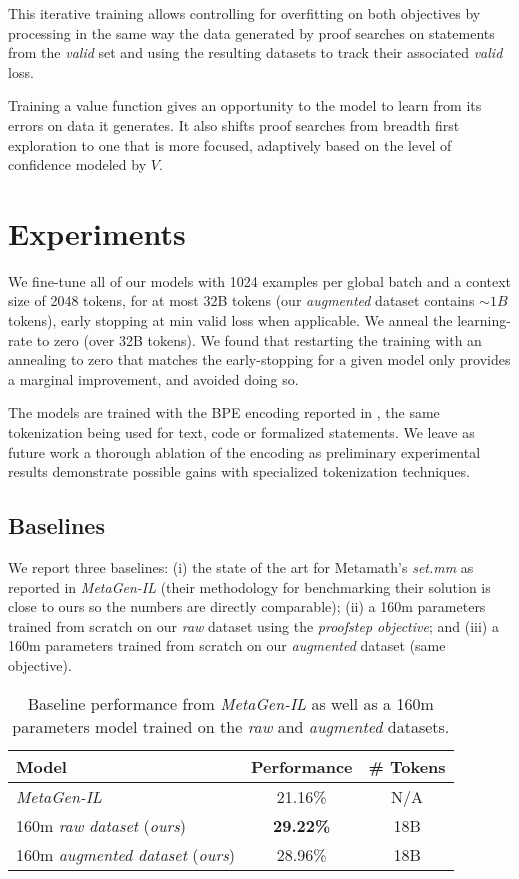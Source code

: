 \documentclass{article}
\begin{document}
This iterative training allows controlling for overfitting on both objectives by processing in the same way the data generated by proof searches on statements from the \textit{valid} set and using the resulting datasets to track their associated \textit{valid} loss.

Training a value function gives an opportunity to the model to learn from its errors on data it generates. It also shifts proof searches from breadth first exploration to one that is more focused, adaptively based on the level of confidence modeled by $V$.

\section{Experiments}
\label{section:experiments}

We fine-tune all of our models with 1024 examples per global batch and a context size of 2048 tokens, for at most 32B tokens (our \textit{augmented} dataset contains $\sim 1B$ tokens), early stopping at min valid loss when applicable. We anneal the learning-rate to zero (over 32B tokens). We found that restarting the training with an annealing to zero that matches the early-stopping for a given model only provides a marginal improvement, and avoided doing so.

The models are trained with the BPE encoding reported in \cite{brown2020language}, the same tokenization being used for text, code or formalized statements. We leave as future work a thorough ablation of the encoding as preliminary experimental results demonstrate possible gains with specialized tokenization techniques. 

\subsection{Baselines}

We report three baselines: (i) the state of the art for Metamath's \textit{set.mm} as reported in \textit{MetaGen-IL}\cite{wang2020learning} (their methodology for benchmarking their solution is close to ours so the numbers are directly comparable); (ii) a 160m parameters trained from scratch on our \textit{raw} dataset using the \textit{proofstep objective}; and (iii) a 160m parameters trained from scratch on our \textit{augmented} dataset (same objective).

\begin{table}[ht]
\caption{Baseline performance from \textit{MetaGen-IL} as well as a 160m parameters model trained on the \textit{raw} and \textit{augmented} datasets.} 
\centering
\begin{tabular}{ |l|c|c| }
    \hline
    Model & Performance & \# Tokens \\
    \hline
    \textit{MetaGen-IL}\cite{wang2020learning} & 21.16\% & N/A \\
    160m \textit{raw dataset} (\textit{ours}) & \textbf{29.22\%} & 18B \\
    160m \textit{augmented dataset} (\textit{ours}) & 28.96\% & 18B \\
    \hline
\end{tabular}
\label{table:baselines}
\end{table}
\end{document}
